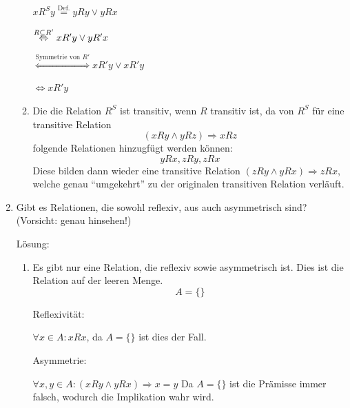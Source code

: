 \documentclass[main.tex]{subfiles}
\begin{document}
\begin{enumerate}
\begin{enumerate}
		            \( xR^Sy \stackrel{\text{Def.}}{=} yRy \lor yRx \)

		            \( \stackrel{\tiny{R \subseteq R'}}{\Leftrightarrow} xR'y \lor yR'x \)

		            \( \stackrel{\text{Symmetrie von } R'}{\Leftrightarrow} xR'y \lor xR'y \)

		            \( \Leftrightarrow xR'y \)
		      \item Die die Relation \( R^S \) ist transitiv, wenn \( R \) transitiv ist, da
		            von \( R^S \) für eine transitive Relation
		            \[ (xRy \land yRz) \Rightarrow xRz \]
		            folgende Relationen hinzugfügt werden können:
		            \[ yRx, zRy, zRx \]
		            Diese bilden dann wieder eine transitive Relation
		            \( (zRy \land yRx) \Rightarrow zRx \), welche genau "`umgekehrt"'
		            zu der originalen transitiven Relation verläuft.

	      \end{enumerate}
	\item Gibt es Relationen, die sowohl reflexiv, aus auch asymmetrisch sind?
	      (Vorsicht: genau hinsehen!)

	      Lösung:
	      \begin{enumerate}
		      \item Es gibt nur eine Relation, die reflexiv sowie asymmetrisch ist. Dies ist die Relation
		            auf der leeren Menge.
		            \[ A = \{ \} \]

		            Reflexivität:

		            \( \forall x \in A: xRx \), da \( A = \{\} \) ist dies der Fall.

		            Asymmetrie:

		            \( \forall x,y \in A: (xRy \land yRx) \Rightarrow x = y\)
		            Da \( A = \{\} \) ist die Prämisse immer falsch, wodurch die Implikation wahr wird.
	      \end{enumerate}
\end{enumerate}
\end{document}
